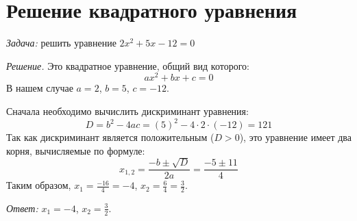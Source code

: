 \documentclass{article}
\begin{document}
\section{Решение квадратного уравнения}
\emph{Задача: }решить уравнение \(2x^2 + 5x - 12 = 0\) 

\emph{Решение.} Это квадратное уравнение, общий вид которого:
\[ax^2 + bx + c = 0\]
В нашем случае \(a = 2\), \(b = 5\), \(c = -12\).

Сначала необходимо вычислить дискриминант уравнения:
\[ D = b^2 - 4ac = (5)^2 - 4\cdot2\cdot(-12) = 121 \]
Так как дискриминант  является положительным (\(D > 0 \)), это уравнение имеет два корня, вычисляемые по формуле:
\[ x_{1,2}=\frac{-b\pm\sqrt{D}}{2a}=\frac{-5\pm11}{4} \]
Таким образом, \( x_{1} = \frac{-16}{4} = -4 \), \( x_{2} = \frac{6}{4} = \frac{3}{2} \).

\emph{Ответ: }\( x_{1} = -4 \), \( x_{2} = \frac{3}{2} \).
\end{document}
